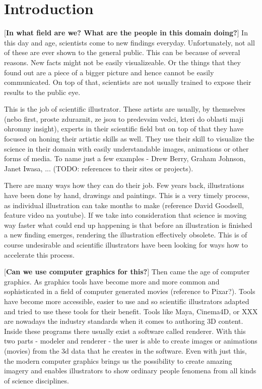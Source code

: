 \documentclass[
  digital, %
  table,   %
  nolof,     %
  nolot,     %
]{fithesis3}
\begin{document}
\chapter{Introduction}
[\textbf{In what field are we? What are the people in this domain doing?}]
In this day and age, scientists come to new findings everyday. Unfortunately, not all of these are ever shown to the general public. This can be because of several reasons. New facts might not be easily visualizeable. Or the things that they found out are a piece of a bigger picture and hence cannot be easily communicated. On top of that, scientists are not usually trained to expose their results to the public eye.

This is the job of scientific illustrator. These artists are usually, by themselves (nebo first, proste zduraznit, ze jsou to predevsim vedci, kteri do oblasti maji ohromny insight), experts in their scientific field but on top of that they have focused on honing their artistic skills as well. They use their skill to visualize the science in their domain with easily understandable images, animations or other forms of media. To name just a few examples - Drew Berry, Graham Johnson, Janet Iwasa, ... (TODO: references to their sites or projects).

There are many ways how they can do their job. Few years back, illustrations have been done by hand, drawings and paintings. This is a very timely process, as individual illustration can take months to make (reference David Goodsell, feature video na youtube). If we take into consideration that science is moving way faster what could end up happening is that before an illustration is finished a new finding emerges, rendering the illustration effectively obsolete. This is of course undesirable and scientific illustrators have been looking for ways how to accelerate this process.

[\textbf{Can we use computer graphics for this?}]
Then came the age of computer graphics. As graphics tools have become more and more common and sophisticated in a field of computer generated movies (reference to Pixar?). Tools have become more accessible, easier to use and so scientific illustrators adapted and tried to use these tools for their benefit. Tools like Maya, Cinema4D, or XXX are nowadays the industry standards when it comes to authoring 3D content. Inside these programs there usually exist a software called renderer. With this two parts - modeler and renderer - the user is able to create images or animations (movies) from the 3d data that he creates in the software.
Even with just this, the modern computer graphics brings us the possibility to create amazing imagery and enables illustrators to show ordinary people fenomena from all kinds of science disciplines.
\end{document}
